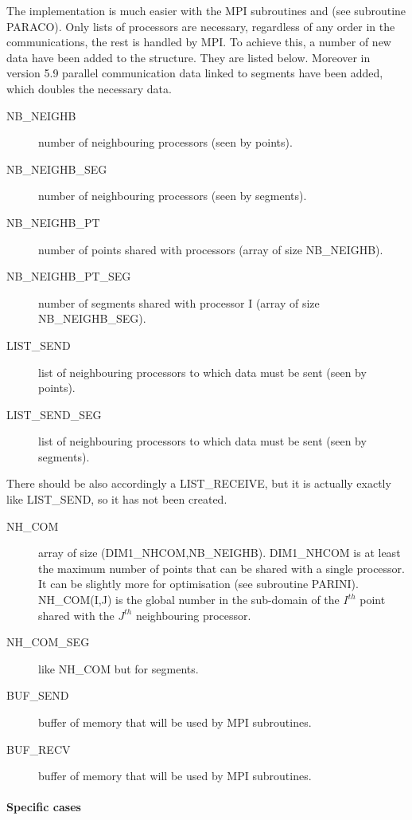 The implementation is much easier with the MPI subroutines 
and  (see subroutine PARACO). Only lists of processors are
necessary, regardless of any order in the communications, the rest is handled
by MPI. To achieve this, a number of new data have been added to the
 structure. They are listed below. Moreover in version 5.9
parallel communication data linked to segments have been added, which doubles
the necessary data.
\begin{description}
  \item [NB\_NEIGHB] number of neighbouring processors (seen by points).
  \item [NB\_NEIGHB\_SEG] number of neighbouring processors (seen by segments).
  \item [NB\_NEIGHB\_PT] number of points shared with processors (array of size
    NB\_NEIGHB).
  \item [NB\_NEIGHB\_PT\_SEG] number of segments shared with processor I (array
    of size NB\_NEIGHB\_SEG).
  \item [LIST\_SEND] list of neighbouring processors to which data must be sent
    (seen by points).
  \item [LIST\_SEND\_SEG] list of neighbouring processors to which data must be
    sent (seen by segments).
\end{description}
There should be also accordingly a LIST\_RECEIVE, but it is actually exactly
like LIST\_SEND, so it has not been created.
\begin{description}
  \item [NH\_COM] array of size (DIM1\_NHCOM,NB\_NEIGHB). DIM1\_NHCOM is at
    least the maximum number of points that can be shared with a single
    processor. It can be slightly more for optimisation (see subroutine
    PARINI). NH\_COM(I,J) is the global number in the sub-domain of the
    $I^{th}$ point shared with the $J^{th}$ neighbouring processor.
  \item [NH\_COM\_SEG] like NH\_COM but for segments.
  \item [BUF\_SEND] buffer of memory that will be used by MPI subroutines.
  \item [BUF\_RECV] buffer of memory that will be used by MPI subroutines.
\end{description}

\paragraph{Specific cases}

